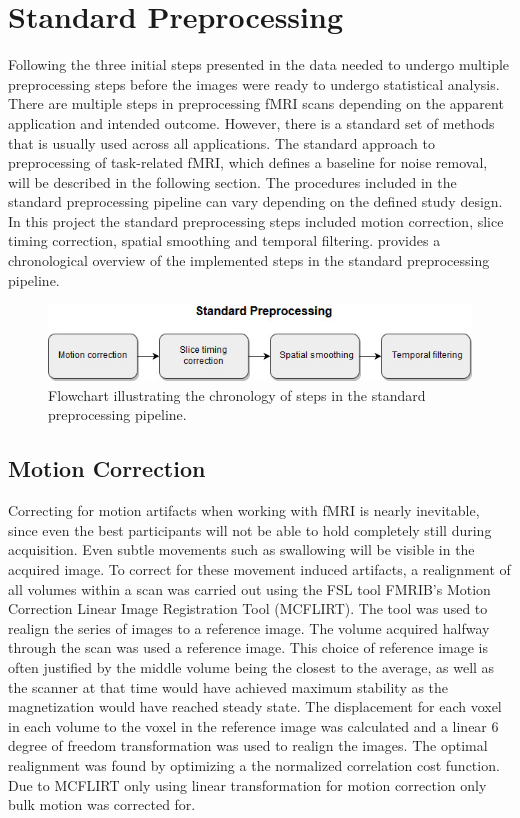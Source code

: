 \section{Standard Preprocessing} \label{sec:std}

Following the three initial steps presented in  the data needed to undergo multiple preprocessing steps before the images were ready to undergo statistical analysis. There are multiple steps in preprocessing fMRI scans depending on the apparent application and intended outcome. However, there is a standard set of methods that is usually used across all applications. \cite{Moayedi2018} The standard approach to preprocessing of task-related fMRI, which defines a baseline for noise removal, will be described in the following section. The procedures included in the standard preprocessing pipeline can vary depending on the defined study design. In this project the standard preprocessing steps included motion correction, slice timing correction, spatial smoothing and temporal filtering.  provides a chronological overview of the implemented steps in the standard preprocessing pipeline.      

\begin{figure}[H]                 
	\includegraphics[width=.7\textwidth]{figures/bMethods/Standard_preprocessing} 
	\caption{Flowchart illustrating the chronology of steps in the standard preprocessing pipeline.}
	\label{fig:meth:std} 
\end{figure}

\subsection{Motion Correction}

Correcting for motion artifacts when working with fMRI is nearly inevitable, since even the best participants will not be able to hold completely still during acquisition. Even subtle movements such as swallowing will be visible in the acquired image. \cite{Poldrack2011} To correct for these movement induced artifacts, a realignment of all volumes within a scan was carried out using the FSL tool FMRIB's Motion Correction Linear Image Registration Tool (MCFLIRT). \cite{Jenkinson2002}
The tool was used to realign the series of images to a reference image. The volume acquired halfway through the scan was used a reference image. This choice of reference image is often justified by the middle volume being the closest to the average, as well as the scanner at that time would have achieved maximum stability as the magnetization would have reached steady state. \cite{Poldrack2011} The displacement for each voxel in each volume to the voxel in the reference image was calculated and a linear 6 degree of freedom transformation was used to realign the images. The optimal realignment was found by optimizing a the normalized correlation cost function. Due to MCFLIRT only using linear transformation for motion correction only bulk motion was corrected for. \cite{Jenkinson2002}



